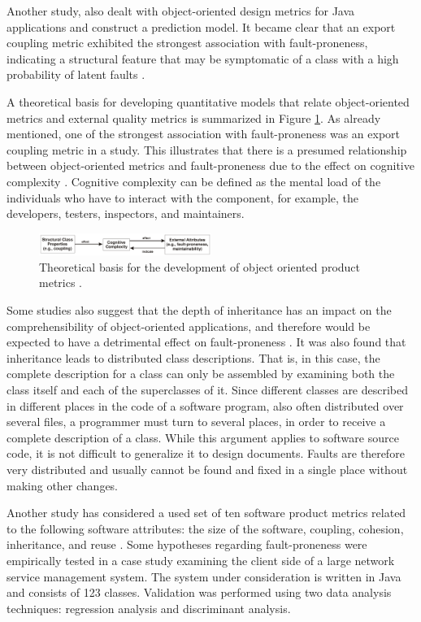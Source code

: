 Another study, also dealt with object-oriented design metrics for Java applications and construct a prediction model. It became clear that an export coupling metric exhibited the strongest association with fault-proneness, indicating a structural feature that may be symptomatic of a class with a high probability of latent faults \cite{b10el2001prediction}.

A theoretical basis for developing quantitative models that relate object-oriented metrics and external quality metrics is summarized in Figure \ref{figCoupling}. As already mentioned, one of the strongest association with fault-proneness was an export coupling metric in a study. This illustrates that there is a presumed relationship between object-oriented metrics and fault-proneness due to the effect on cognitive complexity \cite{b10el2001prediction}. Cognitive complexity can be defined as the mental load of the individuals who have to interact with the component, for example, the developers, testers, inspectors, and maintainers. 

\begin{figure}[htbp]
	\centerline{\includegraphics[width=0.5\textwidth]{pictures/faultyclasses1.png}}
	\caption{Theoretical basis for the development of object oriented product metrics \cite{b10el2001prediction}.}
	\label{figCoupling}
\end{figure}

Some studies also suggest that the depth of inheritance has an impact on the comprehensibility of object-oriented applications, and therefore would be expected to have a detrimental effect on fault-proneness \cite{b10el2001prediction}.
It was also found that inheritance leads to distributed class descriptions. That is, in this case, the complete description for a class can only be assembled by examining both the class itself and each of the superclasses of it.
Since different classes are described in different places in the code of a software program, also often distributed over several files, a programmer must turn to several places, in order to receive a complete description of a class. While this argument applies to software source code, it is not difficult to generalize it to design documents. Faults are therefore very distributed and usually cannot be found and fixed in a single place without making other changes.

Another study has considered a used set of ten software product metrics related to the following software attributes: the size of the software, coupling, cohesion, inheritance, and reuse \cite{yu2002predicting}. Some hypotheses regarding fault-proneness were empirically tested in a case study examining the client side of a large network service management system. The system under consideration is written in Java and consists of 123 classes. Validation was performed using two data analysis techniques: regression analysis and discriminant analysis.


